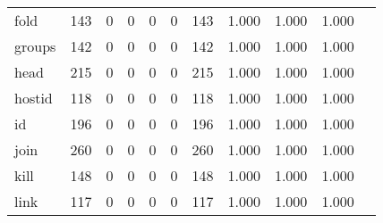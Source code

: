 \begin{longtable}{lp{1.10cm}p{1.10cm}p{1.10cm}p{1.10cm}p{1.10cm}p{1.10cm}p{1.10cm}p{1.10cm}p{1.10cm}p{1.10cm}}
fold      &                    143 &                                  0 &                                 0 &                                0 &                                 0 &                             143 &                             1.000 &                                 1.000 &                               1.000 \\
groups    &                    142 &                                  0 &                                 0 &                                0 &                                 0 &                             142 &                             1.000 &                                 1.000 &                               1.000 \\
head      &                    215 &                                  0 &                                 0 &                                0 &                                 0 &                             215 &                             1.000 &                                 1.000 &                               1.000 \\
hostid    &                    118 &                                  0 &                                 0 &                                0 &                                 0 &                             118 &                             1.000 &                                 1.000 &                               1.000 \\
id        &                    196 &                                  0 &                                 0 &                                0 &                                 0 &                             196 &                             1.000 &                                 1.000 &                               1.000 \\
join      &                    260 &                                  0 &                                 0 &                                0 &                                 0 &                             260 &                             1.000 &                                 1.000 &                               1.000 \\
kill      &                    148 &                                  0 &                                 0 &                                0 &                                 0 &                             148 &                             1.000 &                                 1.000 &                               1.000 \\
link      &                    117 &                                  0 &                                 0 &                                0 &                                 0 &                             117 &                             1.000 &                                 1.000 &                               1.000 \\

\end{longtable}
